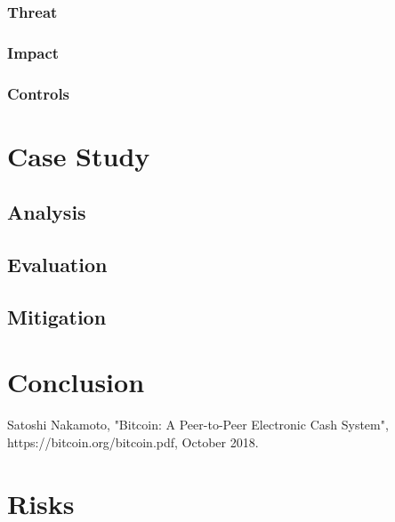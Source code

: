 \documentclass[11pt,a4paper,draft]{article}
\begin{document}
\subsubsection{Threat}

\subsubsection{Impact}

\subsubsection{Controls}

\section{Case Study}

\subsection{Analysis}

\subsection{Evaluation}

\subsection{Mitigation}

\section{Conclusion}

\newpage
\begin{thebibliography}{9}

Satoshi Nakamoto,
"Bitcoin: A Peer-to-Peer Electronic Cash System",
https://bitcoin.org/bitcoin.pdf,
October 2018.

\end{thebibliography}

\newpage
\appendix

\section{Risks}
\end{document}
